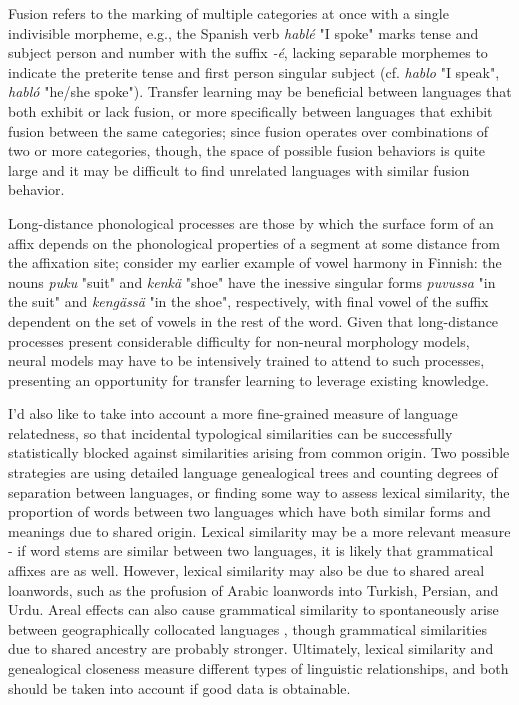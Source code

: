 Fusion refers to the marking of multiple categories at once with a single indivisible morpheme, e.g., the Spanish verb \textit{hablé} "I spoke" marks tense and subject person and number with the suffix \textit{-é}, lacking separable morphemes to indicate the preterite tense and first person singular subject (cf. \textit{hablo} "I speak", \textit{habló} "he/she spoke"). Transfer learning may be beneficial between languages that both exhibit or lack fusion, or more specifically between languages that exhibit fusion between the same categories; since fusion operates over combinations of two or more categories, though, the space of possible fusion behaviors is quite large and it may be difficult to find unrelated languages with similar fusion behavior. 

Long-distance phonological processes are those by which the surface form of an affix depends on the phonological properties of a segment at some distance from the affixation site; consider my earlier example of vowel harmony in Finnish: the nouns \textit{puku} "suit" and \textit{kenkä} "shoe" have the inessive singular forms \textit{puvussa} "in the suit" and \textit{kengässä} "in the shoe", respectively, with final vowel of the suffix dependent on the set of vowels in the rest of the word. Given that long-distance processes present considerable difficulty for non-neural morphology models, neural models may have to be intensively trained to attend to such processes, presenting an opportunity for transfer learning to leverage existing knowledge.

I'd also like to take into account a more fine-grained measure of language relatedness, so that incidental typological similarities can be successfully statistically blocked against similarities arising from common origin. Two possible strategies are using detailed language genealogical trees and counting degrees of separation between languages, or finding some way to assess lexical similarity, the proportion of words between two languages which have both similar forms and meanings due to shared origin. Lexical similarity may be a more relevant measure - if word stems are similar between two languages, it is likely that grammatical affixes are as well. However, lexical similarity may also be due to shared areal loanwords, such as the profusion of Arabic loanwords into Turkish, Persian, and Urdu. Areal effects can also cause grammatical similarity to spontaneously arise between geographically collocated languages \parencite{Ponti2018}, though grammatical similarities due to shared ancestry are probably stronger. Ultimately, lexical similarity and genealogical closeness measure different types of linguistic relationships, and both should be taken into account if good data is obtainable.

